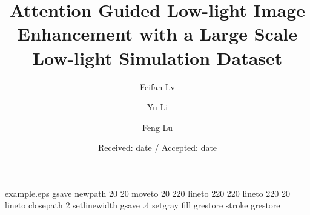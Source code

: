 \begin{filecontents*}{example.eps}
gsave
newpath
  20 20 moveto
  20 220 lineto
  220 220 lineto
  220 20 lineto
closepath
2 setlinewidth
gsave
  .4 setgray fill
grestore
stroke
grestore
\end{filecontents*}
\RequirePackage{fix-cm}
\documentclass[twocolumn]{svjour3}          \smartqed  

\usepackage{color}
\usepackage{booktabs}
\usepackage{multirow}
\usepackage{array}
\usepackage{lipsum}
\usepackage{graphicx}
\usepackage{caption}
\usepackage{amsmath}
\usepackage[colorlinks, linkcolor=red, anchorcolor=blue, citecolor=green]{hyperref}
\usepackage{float}
\usepackage{subfigure}
\usepackage{rotating}
\usepackage{makecell}
\usepackage[abs]{overpic}
\usepackage[noend]{algpseudocode}
\usepackage{algorithmicx,algorithm}
\usepackage{amssymb}

\newenvironment{shrinkeq}[1]
{ \bgroup
	\addtolength\abovedisplayshortskip{#1}
	\addtolength\abovedisplayskip{#1}
	\addtolength\belowdisplayshortskip{#1}
	\addtolength\belowdisplayskip{#1}}
{\egroup\ignorespacesafterend}

\def\eg{\emph{e.g.}}
\def\Eg{\emph{E.g.}}
\def\etal{\emph{et al.}}


\title{Attention Guided Low-light Image Enhancement with a Large Scale Low-light Simulation Dataset}
\author{Feifan Lv         \and
	Yu Li         \and
	Feng Lu }




\date{Received: date / Accepted: date}


\maketitle

